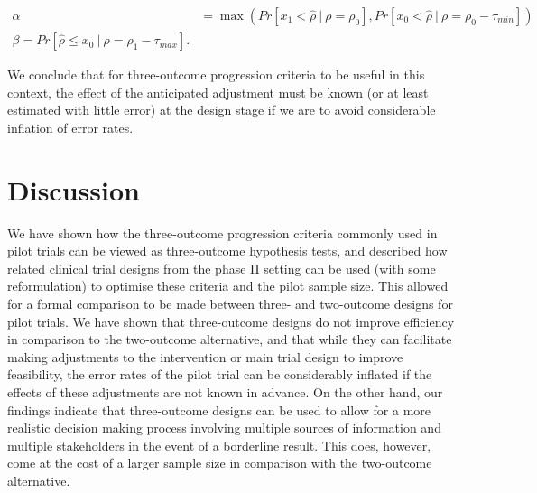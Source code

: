 \documentclass{bmcart}
\begin{document}
\begin{align}
    \alpha &= \max \left( Pr[ x_1 < \hat{\rho} ~|~ \rho = \rho_0] , Pr[x_0 < \hat{\rho} ~|~ \rho = \rho_0 - \tau_{min}] \right) \\
    \beta = Pr[\hat{\rho} \leq x_0 ~|~ \rho = \rho_1 - \tau_{max}].
\end{align}



We conclude that for three-outcome progression criteria to be useful in this context, the effect of the anticipated adjustment must be known (or at least estimated with little error) at the design stage if we are to avoid considerable inflation of error rates.

\section{Discussion}\label{sec:discussion}




We have shown how the three-outcome progression criteria commonly used in pilot trials can be viewed as three-outcome hypothesis tests, and described how related clinical trial designs from the phase II setting can be used (with some reformulation) to optimise these criteria and the pilot sample size. This allowed for a formal comparison to be made between three- and two-outcome designs for pilot trials. We have shown that three-outcome designs do not improve efficiency in comparison to the two-outcome alternative, and that while they can facilitate making adjustments to the intervention or main trial design to improve feasibility, the error rates of the pilot trial can be considerably inflated if the effects of these adjustments are not known in advance. On the other hand, our findings indicate that three-outcome designs can be used to allow for a more realistic decision making process involving multiple sources of information and multiple stakeholders in the event of a borderline result. This does, however, come at the cost of a larger sample size in comparison with the two-outcome alternative.
\end{document}
